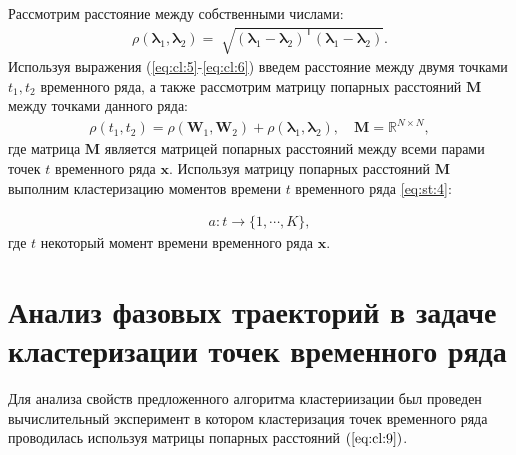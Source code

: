 Рассмотрим расстояние между собственными числами:
\[
\label{eq:cl:6}
\begin{aligned}
\rho\left(\bm{\lambda}_1, \bm{\lambda}_2\right) = \sqrt[]{\left(\bm{\lambda}_1 - \bm{\lambda}_2\right)^{\mathsf{T}}\left(\bm{\lambda}_1 - \bm{\lambda}_2\right)}.
\end{aligned}
\]
Используя выражения (\ref{eq:cl:5}-\ref{eq:cl:6}) введем расстояние между двумя точками $t_1, t_2$ временного ряда, а также рассмотрим матрицу попарных расстояний $\textbf{M}$ между точками данного ряда:
\[
\label{eq:cl:9}
\begin{aligned}
\rho\left(t_1, t_2\right) = \rho\left(\textbf{W}_1, \textbf{W}_2\right) + \rho\left(\bm{\lambda}_1, \bm{\lambda}_2\right), \quad \textbf{M} =  \mathbb{R}^{N\times N},
\end{aligned}
\]
где %
матрица $\textbf{M}$ является матрицей попарных расстояний между всеми парами точек $t$ временного ряда $\textbf{x}$.
Используя матрицу попарных расстояний $\textbf{M}$ выполним кластеризацию моментов времени $t$ временного ряда \eqref{eq:st:4}:

\[
\label{eq:cl:10}
\begin{aligned}
a : t \to \{1,\cdots, K\}, 
\end{aligned}
\]
где $t$ некоторый момент времени временного ряда $\textbf{x}$.

\section{Анализ фазовых траекторий в задаче кластеризации точек временного ряда}
Для анализа свойств предложенного алгоритма кластериизации был проведен вычислительный эксперимент в котором кластеризация точек временного ряда проводилась используя матрицы попарных расстояний $(\ref{eq:cl:9})$.

